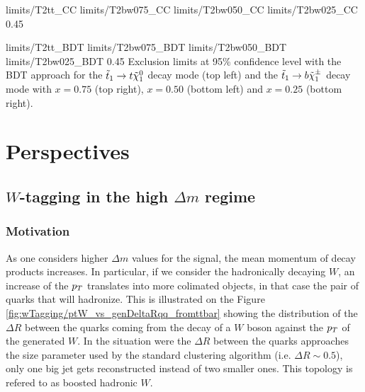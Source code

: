                           {limits/T2tt_CC}
                          {limits/T2bw075_CC}
                          {limits/T2bw050_CC}
                          {limits/T2bw025_CC}
                          {0.45}
                          {}

                          {limits/T2tt_BDT}
                          {limits/T2bw075_BDT}
                          {limits/T2bw050_BDT}
                          {limits/T2bw025_BDT}
                          {0.45}
                          {Exclusion limits at 95\% confidence level with the BDT approach for the $\tilde{t}_1 \rightarrow t \tilde{\chi}_1^0$ decay mode (top left) and the $\tilde{t}_1 \rightarrow b \tilde{\chi}_1^\pm$ decay mode with $x=0.75$ (top right), $x=0.50$ (bottom left) and $x=0.25$ (bottom right). }
    \newpage

    \section{Perspectives \label{sec:analysis_perspective}}
        \loremipsum
        \subsection{$W$-tagging in the high $\Delta m$ regime}
        
            \subsubsection{Motivation}

             As one considers higher $\Delta m$ values for the signal, the mean momentum of
             decay products increases. In particular, if we consider the hadronically
             decaying $W$, an increase of the $p_T$ translates into more colimated objects,
             in that case the pair of quarks that will hadronize. This is illustrated on
             the Figure \ref{fig:wTagging/ptW_vs_genDeltaRqq_fromttbar} showing the 
             distribution of the $\Delta R$ between the
             quarks coming from the decay of a $W$ boson against the $p_T$ of the generated
             $W$. In the situation were the $\Delta R$ between the quarks approaches the 
             size parameter used by the standard clustering algorithm (i.e. $\Delta R 
             \sim 0.5$), only one big jet gets reconstructed instead of two smaller ones.
             This topology is refered to as boosted hadronic $W$. 
            
